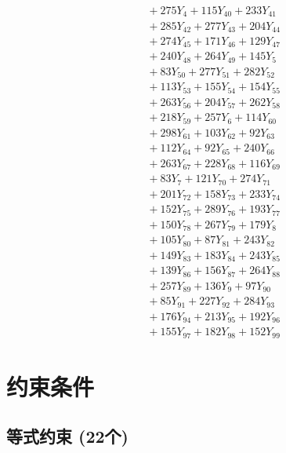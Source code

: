 \documentclass[a4paper,10pt]{article}
\begin{document}
{\begin{align}
&\quad  + 275Y_{4} + 115Y_{40} + 233Y_{41} \\[0.5ex]
&\quad  + 285Y_{42} + 277Y_{43} + 204Y_{44} \\[0.5ex]
&\quad  + 274Y_{45} + 171Y_{46} + 129Y_{47} \\[0.5ex]
&\quad  + 240Y_{48} + 264Y_{49} + 145Y_{5} \\[0.5ex]
&\quad  + 83Y_{50} + 277Y_{51} + 282Y_{52} \\[0.5ex]
&\quad  + 113Y_{53} + 155Y_{54} + 154Y_{55} \\[0.5ex]
&\quad  + 263Y_{56} + 204Y_{57} + 262Y_{58} \\[0.5ex]
&\quad  + 218Y_{59} + 257Y_{6} + 114Y_{60} \\[0.5ex]
&\quad  + 298Y_{61} + 103Y_{62} + 92Y_{63} \\[0.5ex]
&\quad  + 112Y_{64} + 92Y_{65} + 240Y_{66} \\[0.5ex]
&\quad  + 263Y_{67} + 228Y_{68} + 116Y_{69} \\[0.5ex]
&\quad  + 83Y_{7} + 121Y_{70} + 274Y_{71} \\[0.5ex]
&\quad  + 201Y_{72} + 158Y_{73} + 233Y_{74} \\[0.5ex]
&\quad  + 152Y_{75} + 289Y_{76} + 193Y_{77} \\[0.5ex]
&\quad  + 150Y_{78} + 267Y_{79} + 179Y_{8} \\[0.5ex]
&\quad  + 105Y_{80} + 87Y_{81} + 243Y_{82} \\[0.5ex]
&\quad  + 149Y_{83} + 183Y_{84} + 243Y_{85} \\[0.5ex]
&\quad  + 139Y_{86} + 156Y_{87} + 264Y_{88} \\[0.5ex]
&\quad  + 257Y_{89} + 136Y_{9} + 97Y_{90} \\[0.5ex]
&\quad  + 85Y_{91} + 227Y_{92} + 284Y_{93} \\[0.5ex]
&\quad  + 176Y_{94} + 213Y_{95} + 192Y_{96} \\[0.5ex]
&\quad  + 155Y_{97} + 182Y_{98} + 152Y_{99}\nonumber
\end{align}
}

\section{约束条件}

\subsection{等式约束 (22个)}
\end{document}
